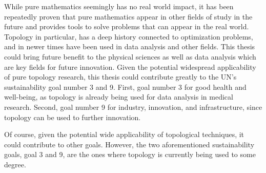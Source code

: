 While pure mathematics seemingly has no real world impact, it has been repeatedly proven that pure mathematics appear in other fields of study in the future and provides tools to solve problems that can appear in the real world. Topology in particular, has a deep history connected to optimization problems, and in newer times have been used in data analysis and other fields. This thesis could bring future benefit to the physical sciences as well as data analysis which are key fields for future innovation. Given the potential widespread applicability of pure topology research, this thesis could contribute greatly to the UN's sustainability goal number 3 and 9. First, goal number 3 for good health and well-being, as topology is already being used for data analysis in medical research. Second, goal number 9 for industry, innovation, and infrastructure, since topology can be used to further innovation.

Of course, given the potential wide applicability of topological techniques, it could contribute to other goals. However, the two aforementioned sustainability goals, goal 3 and 9, are the ones where topology is currently being used to some degree.